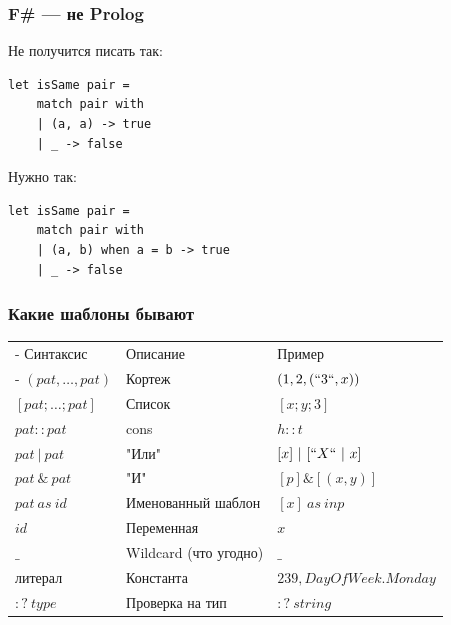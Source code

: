 \documentclass[xetex,mathserif,serif]{beamer}
\begin{document}
	\begin{frame}[fragile]
		\frametitle{F\# --- не Prolog}
		Не получится писать так:
		\begin{verbatim}
let isSame pair =
    match pair with
    | (a, a) -> true
    | _ -> false
		\end{verbatim}
		Нужно так:
		\begin{verbatim}
let isSame pair =
    match pair with
    | (a, b) when a = b -> true
    | _ -> false
		\end{verbatim}
	\end{frame}

	\begin{frame}
		\frametitle{Какие шаблоны бывают}
		\begin{small}
			\begin{tabu} {| X[0.9 l p] | X[1 l p] | X[1 l p] |}
				\tabucline-
				Синтаксис                               & Описание                  & Пример                  \\
				\tabucline-
				\everyrow{\tabucline-}
				$(pat, \ldots, pat)$                    & Кортеж                    & $(1, 2, (``3``, x))$    \\
				$[pat; \ldots; pat]$                    & Список                    & $[x; y; 3]$             \\
				$pat :: pat$                            & cons                      & $h :: t$                \\
				$pat\ |\ pat$                           & "Или"                     & $[x]\ |\ [``X``\ |\ x]$ \\
				$pat\ \&\ pat$                          & "И"                       & $[p] \& [(x, y)]$       \\
				$pat\ as\ id$                           & Именованный шаблон        & $[x]\ as\ inp$          \\
				$id$                                    & Переменная                & $x$                     \\
				$\_$                                    & Wildcard (что угодно)     & $\_$                    \\
				литерал                                 & Константа                 & $239, DayOfWeek.Monday$ \\
				$:?\ type$                              & Проверка на тип           & $:?\ string$            \\
			\end{tabu}
		\end{small}
	\end{frame}
\end{document}
